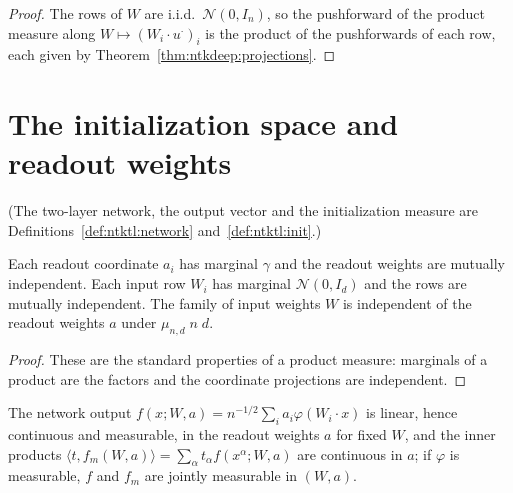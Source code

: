 \begin{proof}
  \leanok
The rows of $W$ are i.i.d.\ $\mathcal N(0,I_n)$, so the pushforward of the product measure along $W\mapsto(W_i\cdot u^\cdot)_i$ is the product of the pushforwards of each row, each given by Theorem~\ref{thm:ntkdeep:projections}.
\end{proof}


\section{The initialization space and readout weights}\label{sec:ntkdeep:setup}

(The two-layer network, the output vector and the initialization measure are Definitions~\ref{def:ntktl:network} and~\ref{def:ntktl:init}.)

\begin{lemma}\label{lem:ntkdeep:independence}
  \leanok
Each readout coordinate $a_i$ has marginal $\gamma$ and the readout weights are mutually independent. Each input row $W_i$ has marginal $\mathcal N(0,I_d)$ and the rows are mutually independent. The family of input weights $W$ is independent of the readout weights $a$ under $\mu_{n,d}\;n\;d$.
\end{lemma}

\begin{proof}
  \leanok
These are the standard properties of a product measure: marginals of a product are the factors and the coordinate projections are independent.
\end{proof}

\begin{lemma}\label{lem:ntkdeep:evalMaps}
  \leanok
The network output $f(x;W,a)=n^{-1/2}\sum_ia_i\varphi(W_i\cdot x)$ is linear, hence continuous and measurable, in the readout weights $a$ for fixed $W$, and the inner products $\langle t,f_m(W,a)\rangle=\sum_\alpha t_\alpha f(x^\alpha;W,a)$ are continuous in $a$; if $\varphi$ is measurable, $f$ and $f_m$ are jointly measurable in $(W,a)$.
\end{lemma}

